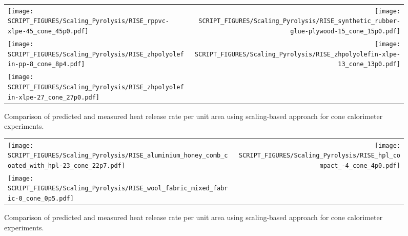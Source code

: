\begin{figure}[p]
\begin{tabular*}{\textwidth}{l@{\extracolsep{\fill}}r}
\texttt{[image: SCRIPT\_FIGURES/Scaling\_Pyrolysis/RISE\_rppvc-xlpe-45\_cone\_45p0.pdf]} &
\texttt{[image: SCRIPT\_FIGURES/Scaling\_Pyrolysis/RISE\_synthetic\_rubber-glue-plywood-15\_cone\_15p0.pdf]} \\
\texttt{[image: SCRIPT\_FIGURES/Scaling\_Pyrolysis/RISE\_zhpolyolefin-pp-8\_cone\_8p4.pdf]} &
\texttt{[image: SCRIPT\_FIGURES/Scaling\_Pyrolysis/RISE\_zhpolyolefin-xlpe-13\_cone\_13p0.pdf]} \\
\texttt{[image: SCRIPT\_FIGURES/Scaling\_Pyrolysis/RISE\_zhpolyolefin-xlpe-27\_cone\_27p0.pdf]} &
\end{tabular*}
\caption[HRRPUA of RISE Materials using scaling model , Mixtures materials]
{Comparison of predicted and measured heat release rate per unit area using scaling-based approach for cone calorimeter experiments.}
\label{RISE_Materials_HRR_Mixtures}
\end{figure}

\begin{figure}[p]
\begin{tabular*}{\textwidth}{l@{\extracolsep{\fill}}r}
\texttt{[image: SCRIPT\_FIGURES/Scaling\_Pyrolysis/RISE\_aluminium\_honey\_comb\_coated\_with\_hpl-23\_cone\_22p7.pdf]} &
\texttt{[image: SCRIPT\_FIGURES/Scaling\_Pyrolysis/RISE\_hpl\_compact\_-4\_cone\_4p0.pdf]} \\
\texttt{[image: SCRIPT\_FIGURES/Scaling\_Pyrolysis/RISE\_wool\_fabric\_mixed\_fabric-0\_cone\_0p5.pdf]} &
\end{tabular*}
\caption[HRRPUA of RISE Materials using scaling model , Others materials]
{Comparison of predicted and measured heat release rate per unit area using scaling-based approach for cone calorimeter experiments.}
\label{RISE_Materials_HRR_Others}
\end{figure}

